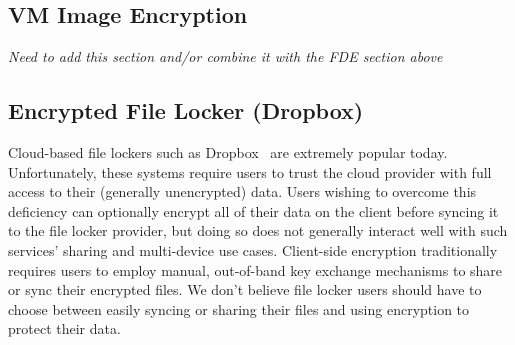 




\subsection{VM Image Encryption}

{\em Need to add this section and/or combine it with the FDE section above}

\subsection{Encrypted File Locker (Dropbox)}

Cloud-based file lockers such as Dropbox~\cite{dropbox} are extremely
popular today. Unfortunately, these systems require users to trust the
cloud provider with full access to their (generally unencrypted)
data. Users wishing to overcome this deficiency can optionally encrypt
all of their data on the client before syncing it to the file locker
provider, but doing so does not generally interact well with such
services' sharing and multi-device use cases. Client-side encryption
traditionally requires users to employ manual, out-of-band key
exchange mechanisms to share or sync their encrypted files. We don't
believe file locker users should have to choose between easily syncing
or sharing their files and using encryption to protect their data.

